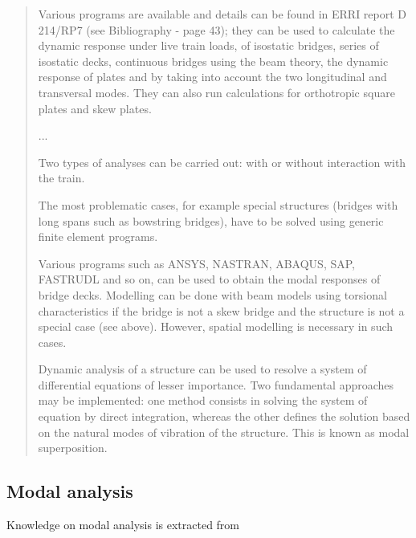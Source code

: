 \begin{quote}

Various programs are available and details can be found in ERRI report D 214/RP7 (see Bibliography - page 43); they can be used to calculate the dynamic response under live train loads, of isostatic bridges, series of isostatic decks, continuous bridges using the beam theory, the dynamic response of plates and by taking into account the two longitudinal and transversal modes. They can also run calculations for orthotropic square plates and skew plates.

...

Two types of analyses can be carried out: with or without interaction with the train.

The most problematic cases, for example special structures (bridges with long spans such as bowstring bridges), have to be solved using generic finite element programs.

Various programs such as ANSYS, NASTRAN, ABAQUS, SAP, FASTRUDL and so on, can be used to obtain the modal responses of bridge decks. Modelling can be done with beam models using torsional characteristics if the bridge is not a skew bridge and the structure is not a special case (see above). However, spatial modelling is necessary in such cases.

Dynamic analysis of a structure can be used to resolve a system of differential equations of lesser importance. Two fundamental approaches may be implemented: one method consists in solving the system of equation by direct integration, whereas the other defines the solution based on the natural modes of vibration of the structure. This is known as modal superposition. 
\end{quote}

\subsection{Modal analysis}

Knowledge on modal analysis is extracted from \citet{UIC776-2}

